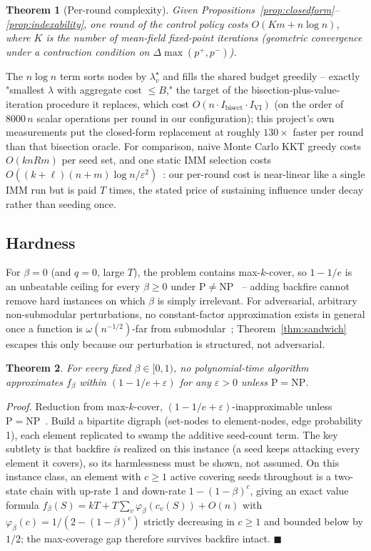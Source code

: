 \documentclass[journal]{IEEEtran}
\newtheorem{theorem}{Theorem}
\begin{document}
\begin{theorem}[Per-round complexity]
\label{thm:complexity}
Given Propositions~\ref{prop:closedform}--\ref{prop:indexability}, one
round of the control policy costs $O(Km+n\log n)$, where $K$ is the number
of mean-field fixed-point iterations (geometric convergence under a
contraction condition on $\Delta\max(p^+,p^-)$).
\end{theorem}
The $n\log n$ term sorts nodes by $\lambda^\star_v$ and fills the shared
budget greedily -- exactly "smallest $\lambda$ with aggregate cost
$\le B$," the target of the bisection-plus-value-iteration procedure it
replaces, which cost $O(n\cdot I_{\mathrm{bisect}}\cdot I_{\mathrm{VI}})$
(on the order of $8000\,n$ scalar operations per round in our
configuration); this project's own measurements put the closed-form
replacement at roughly $130\times$ faster per round than that bisection
oracle. For comparison, naive Monte Carlo KKT greedy costs $O(knRm)$ per
seed set, and one static IMM selection costs
$O((k+\ell)(n+m)\log n/\varepsilon^2)$~\cite{tang2015influence}: our
per-round cost is near-linear like a single IMM run but is paid $T$ times,
the stated price of sustaining influence under decay rather than seeding
once.

\subsection{Hardness}
\label{sec:hardness}

For $\beta=0$ (and $q=0$, large $T$), the problem contains max-$k$-cover, so
$1-1/e$ is an unbeatable ceiling for every $\beta\ge0$ under
$\mathrm{P}\ne\mathrm{NP}$~\cite{feige1998threshold,nemhauser1978analysis} --
adding backfire cannot remove hard instances on which $\beta$ is simply
irrelevant. For adversarial, arbitrary non-submodular perturbations, no
constant-factor approximation exists in general once a function is
$\omega(n^{-1/2})$-far from submodular~\cite{horel2016maximization};
Theorem~\ref{thm:sandwich} escapes this only because our perturbation is
structured, not adversarial.

\begin{theorem}
\label{thm:hardness}
For every fixed $\beta\in[0,1)$, no polynomial-time algorithm approximates
$f_\beta$ within $(1-1/e+\varepsilon)$ for any $\varepsilon>0$ unless
$\mathrm{P}=\mathrm{NP}$.
\end{theorem}
\emph{Proof.} Reduction from max-$k$-cover,
$(1-1/e+\varepsilon)$-inapproximable unless
$\mathrm{P}=\mathrm{NP}$~\cite{feige1998threshold}. Build a bipartite
digraph (set-nodes to element-nodes, edge probability 1), each element
replicated to swamp the additive seed-count term. The key subtlety is that
backfire \emph{is} realized on this instance (a seed keeps attacking every
element it covers), so its harmlessness must be shown, not assumed. On this
instance class, an element with $c\ge1$ active covering seeds throughout is
a two-state chain with up-rate 1 and down-rate $1-(1-\beta)^c$, giving an
exact value formula
$f_\beta(S)=kT+T\sum_v\varphi_\beta(c_v(S))+O(n)$ with
$\varphi_\beta(c)=1/(2-(1-\beta)^c)$ strictly decreasing in $c\ge1$ and
bounded below by $1/2$; the max-coverage gap therefore survives backfire
intact. $\blacksquare$
\end{document}
